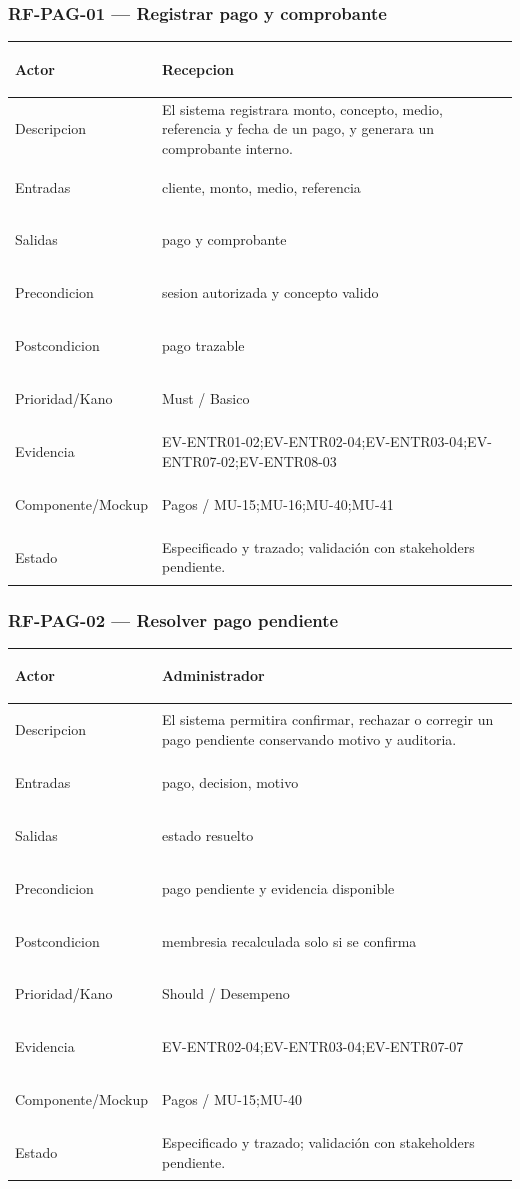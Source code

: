 \documentclass[11pt,a4paper,twoside]{article}
\begin{document}
\subsubsection{RF-PAG-01 — Registrar pago y comprobante}
\begingroup
\renewcommand{\arraystretch}{1.12}
\setlength{\tabcolsep}{5pt}
\begin{tabularx}{\textwidth}{|>{\bfseries\raggedright\arraybackslash}p{3.35cm}|>{\raggedright\arraybackslash}X|}
\hline
Actor & Recepcion \\ \hline
Descripcion & El sistema registrara monto, concepto, medio, referencia y fecha de un pago, y generara un comprobante interno. \\ \hline
Entradas & cliente, monto, medio, referencia \\ \hline
Salidas & pago y comprobante \\ \hline
Precondicion & sesion autorizada y concepto valido \\ \hline
Postcondicion & pago trazable \\ \hline
Prioridad/Kano & Must / Basico \\ \hline
Evidencia & EV-ENTR01-02;EV-ENTR02-04;EV-ENTR03-04;EV-ENTR07-02;EV-ENTR08-03 \\ \hline
Componente/Mockup & Pagos / MU-15;MU-16;MU-40;MU-41 \\ \hline
Estado & Especificado y trazado; validación con stakeholders pendiente. \\ \hline
\end{tabularx}
\endgroup

\subsubsection{RF-PAG-02 — Resolver pago pendiente}
\begingroup
\renewcommand{\arraystretch}{1.12}
\setlength{\tabcolsep}{5pt}
\begin{tabularx}{\textwidth}{|>{\bfseries\raggedright\arraybackslash}p{3.35cm}|>{\raggedright\arraybackslash}X|}
\hline
Actor & Administrador \\ \hline
Descripcion & El sistema permitira confirmar, rechazar o corregir un pago pendiente conservando motivo y auditoria. \\ \hline
Entradas & pago, decision, motivo \\ \hline
Salidas & estado resuelto \\ \hline
Precondicion & pago pendiente y evidencia disponible \\ \hline
Postcondicion & membresia recalculada solo si se confirma \\ \hline
Prioridad/Kano & Should / Desempeno \\ \hline
Evidencia & EV-ENTR02-04;EV-ENTR03-04;EV-ENTR07-07 \\ \hline
Componente/Mockup & Pagos / MU-15;MU-40 \\ \hline
Estado & Especificado y trazado; validación con stakeholders pendiente. \\ \hline
\end{tabularx}
\endgroup
\end{document}
